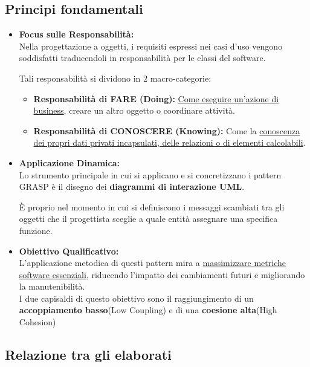 \subsection{Principi fondamentali}
\begin{itemize}
    \item \textbf{Focus sulle Responsabilità:}\\
    Nella progettazione a oggetti, i requisiti espressi nei casi d'uso vengono soddisfatti traducendoli in responsabilità per le classi del software.

    Tali responsabilità si dividono in 2 macro-categorie:
    \begin{itemize}
        \item \textbf{Responsabilità di FARE (Doing):} \uline{Come eseguire un'azione di business}, creare un altro oggetto o coordinare attività.
        \item \textbf{Responsabilità di CONOSCERE (Knowing):} Come la \uline{conoscenza dei propri dati privati incapsulati, delle relazioni o di elementi calcolabili}.
    \end{itemize}
    
    \item \textbf{Applicazione Dinamica:}\\
    Lo strumento principale in cui si applicano e si concretizzano i pattern GRASP è il disegno dei \textbf{diagrammi di interazione UML}.

    È proprio nel momento in cui si definiscono i messaggi scambiati tra gli oggetti che il progettista sceglie a quale entità assegnare una specifica funzione.
    \item \textbf{Obiettivo Qualificativo:}\\
    L'applicazione metodica di questi pattern mira a \uline{massimizzare metriche software essenziali}, riducendo l'impatto dei cambiamenti futuri e migliorando la manutenibilità.\\
    I due capisaldi di questo obiettivo sono il raggiungimento di un \textbf{accoppiamento basso}(Low Coupling) e di una \textbf{coesione alta}(High Cohesion)
\end{itemize}

\newpage
\subsection{Relazione tra gli elaborati}
\begin{figure}[H]
    \centering
\end{figure}

